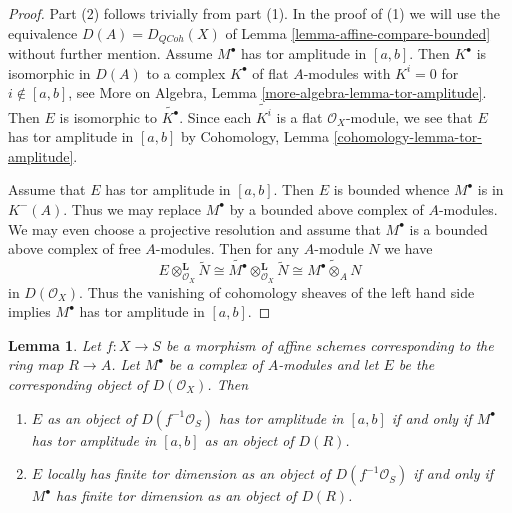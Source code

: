 \documentclass{stacks-project}
\theoremstyle{plain}
\newtheorem{lemma}[subsection]{Lemma}
\theoremstyle{definition}
\theoremstyle{remark}
\numberwithin{equation}{subsection}
\def\QCoh{\mathit{QCoh}}
\begin{document}
\begin{proof}
Part (2) follows trivially from part (1). In the proof of (1) we will
use the equivalence $D(A) = D_\QCoh(X)$ of
Lemma \ref{lemma-affine-compare-bounded}
without further mention.
Assume $M^\bullet$ has tor amplitude in $[a, b]$. Then $K^\bullet$
is isomorphic in $D(A)$ to a complex $K^\bullet$ of flat $A$-modules
with $K^i = 0$ for $i \not \in [a, b]$, see
More on Algebra, Lemma \ref{more-algebra-lemma-tor-amplitude}.
Then $E$ is isomorphic to $\widetilde{K^\bullet}$. Since each
$\widetilde{K^i}$ is a flat $\mathcal{O}_X$-module, we see
that $E$ has tor amplitude in $[a, b]$ by
Cohomology, Lemma \ref{cohomology-lemma-tor-amplitude}.

\medskip\noindent
Assume that $E$ has tor amplitude in $[a, b]$. Then $E$ is bounded
whence $M^\bullet$ is in $K^-(A)$. Thus we may replace $M^\bullet$
by a bounded above complex of $A$-modules. We may even choose
a projective resolution and assume that $M^\bullet$ is a bounded above
complex of free $A$-modules. Then for any $A$-module $N$ we have
$$
E \otimes_{\mathcal{O}_X}^\mathbf{L} \widetilde{N}
\cong
\widetilde{M^\bullet} \otimes_{\mathcal{O}_X}^\mathbf{L} \widetilde{N}
\cong
\widetilde{M^\bullet \otimes_A N}
$$
in $D(\mathcal{O}_X)$. Thus the vanishing of cohomology sheaves of
the left hand side implies $M^\bullet$ has tor amplitude in $[a, b]$.
\end{proof}

\begin{lemma}
\label{lemma-tor-dimension-rel-affine}
Let $f : X \to S$ be a morphism of affine schemes corresponding
to the ring map $R \to A$. Let $M^\bullet$ be a
complex of $A$-modules and let $E$ be the corresponding object
of $D(\mathcal{O}_X)$. Then
\begin{enumerate}
\item $E$ as an object of $D(f^{-1}\mathcal{O}_S)$ has tor amplitude in
$[a, b]$ if and only if $M^\bullet$ has tor amplitude in $[a, b]$
as an object of $D(R)$.
\item $E$ locally has finite tor dimension as an object of
$D(f^{-1}\mathcal{O}_S)$ if and only if $M^\bullet$
has finite tor dimension as an object of $D(R)$.
\end{enumerate}
\end{lemma}
\end{document}
